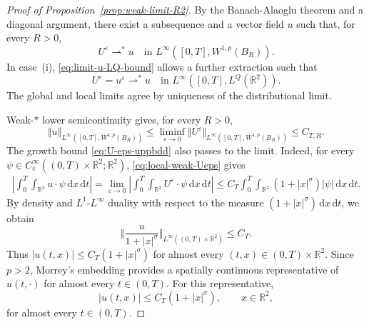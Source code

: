 \documentclass[reqno,11pt,a4paper]{amsart}
\newcommand{\dd}{\mathrm{d}}
\begin{document}
\begin{proof}[Proof of Proposition~\ref{prop:weak-limit-R2}]


By the Banach-Alaoglu theorem and a diagonal argument,
there exist a subsequence and a vector field $u$ such that,
for every $R>0$,
\begin{equation}\label{eq:local-weak-Ueps}
  U^\varepsilon\rightharpoonup^\ast u
  \quad\text{in }
  L^\infty([0,T],W^{1,p}(B_R)).
\end{equation}
In case~(i), \eqref{eq:limit-u-LQ-bound}
allows a further extraction such that
\begin{equation}\label{eq:limit-u-global-LQ}
  U^\varepsilon=u^\varepsilon\rightharpoonup^\ast u
  \quad\text{in }
  L^\infty([0,T],L^Q(\mathbb R^2)).
\end{equation}
The global and local limits agree by uniqueness
of the distributional limit.

Weak-$\ast$ lower semicontinuity gives, for every $R>0$,
\[
  \Vert u\Vert _{L^\infty([0,T],W^{1,p}(B_R))}
  \leq\liminf_{\varepsilon\to0}
    \Vert U^\varepsilon\Vert _{L^\infty([0,T],W^{1,p}(B_R))}
  \leq C_{T,R}.
\]
The growth bound \eqref{eq:U-eps-uppbdd}
also passes to the limit.
Indeed, for every
$\psi\in C_c^\infty((0,T)\times\mathbb R^2;\mathbb R^2)$,
\eqref{eq:local-weak-Ueps} gives
\begin{align*}
  \left|
    \int_0^T\!\int_{\mathbb R^2}
    u\cdot\psi\,\dd x\,\dd t
  \right|
  =
  \lim_{\varepsilon\to0}
  \left|
    \int_0^T\!\int_{\mathbb R^2}
    U^\varepsilon\cdot\psi\,\dd x\,\dd t
  \right|
  \leq
  C_T\int_0^T\!\int_{\mathbb R^2}
    (1+|x|^\sigma)|\psi|\,\dd x\,\dd t.
\end{align*}
By density and $L^1$-$L^\infty$ duality
with respect to the measure
$(1+|x|^\sigma)\,\dd x\,\dd t$, we obtain
\[\Big\Vert 
    \frac{u}{1+|x|^\sigma}
  \Big\Vert _{L^\infty((0,T)\times\mathbb R^2)}
  \leq C_T.
\]
Thus $|u(t,x)|\leq C_T(1+|x|^\sigma)$
for almost every $(t,x)\in(0,T)\times\mathbb R^2$.
Since $p>2$, Morrey's embedding provides a spatially
continuous representative of $u(t,\cdot)$
for almost every $t\in(0,T)$.
For this representative,
\begin{equation}\label{eq:u-upper-bdd}
  |u(t,x)|\leq C_T(1+|x|^\sigma),
  \qquad x\in\mathbb R^2,
\end{equation}
for almost every $t\in(0,T)$.


\end{proof}
\end{document}
